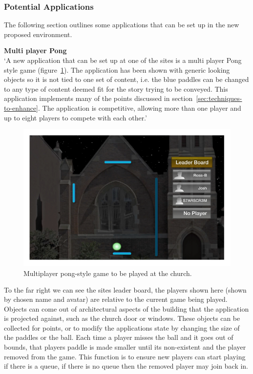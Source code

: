 \documentclass[a4paper,12pt]{article}
\begin{document}
\subsubsection{Potential Applications}
The following section outlines some applications that can be set up in the new proposed environment.

\par\textbf{Multi player Pong}\\
`A new application that can be set up at one of the sites is a multi player Pong style game (figure~\ref{application-multiPlyerPong}). 
The application has been shown with generic looking objects so it is not tied to one set of content, i.e. the blue paddles can be changed to any type of content deemed fit for the story trying to be conveyed.
This application implements many of the points discussed in section~\ref{sec:techniques-to-enhance}. 
The application is competitive, allowing more than one player and up to eight players to compete with each other.'

\begin{figure}[ht!]
	\centering
	\includegraphics[width=125mm]{./images/MultiPlayerChurchGame}
	\caption{Multiplayer pong-style game to be played at the church.}
	\label{application-multiPlyerPong}
\end{figure}

To the far right we can see the sites leader board, the players shown here (shown by chosen name and avatar) are relative to the current game being played. 
Objects can come out of architectural aspects of the building that the application is projected against, such as the church door or windows.
These objects can be collected for points, or to modify the applications state by changing the size of the paddles or the ball.
Each time a player misses the ball and it goes out of bounds, that players paddle is made smaller until its non-existent and the player removed from the game. This function is to ensure new players can start playing if there is a queue, if there is no queue then the removed player may join back in.
\end{document}
